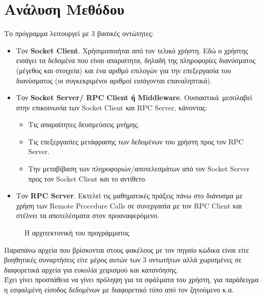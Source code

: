 \section{Ανάλυση Μεθόδου}
Το πρόγραμμα λειτουργεί με 3 βασικές οντώτητες:
\begin{itemize}
    \item Τον \textbf{Socket Client}. Χρήσιμοποιήται από τον τελικό
        χρήστη. Εδώ ο χρήστης εισάγει τα δεδομένα που είναι απαραίτητα, δηλαδή
        της πληροφορίες διανύσματος (μέγεθος και στοιχεία) και ένα αριθμό
        επιλογών για την επεξεργασία του διανύσματος (οι συγκεκριμένοι αριθμοί
        εισάγονται επαναληπτικά).
    \item Τον \textbf{Socket Server/ RPC Client ή Middleware}. Ουσιαστικά\
        μεσολαβεί στην επικοινωνία των Socket Client και RPC Server, κάνοντας:
\begin{itemize}
        \item Τις απαραίτητες δευσμεύσεις μνήμης.
        \item Τις επεξεργασίες μετάφρασης των δεδομένων του χρήστη προς τον
            RPC Server.
        \item Την μεταβίβαση των πληροφοριών/αποτελεσμάτων από τον Socket
            Server προς τον Socket Client και το αντίθετο.
\end{itemize}
    \item Τον \textbf{RPC Server}. Εκτελεί τις μαθηματικές πράξεις πάνω στο
        διάνυσμα με χρήση των Remote Procedure Calls σε συνεργασία με τον
        RPC Client και στέλνει τα αποτελέσματα στον προαναφερόμενο.
\end{itemize}
\begin{figure}[ht]
    \centering
    \caption{\footnotesize{Η αρχιτεκτονική του προγράμματος}}
    \label{fig:searx-oper}
\end{figure}
Παραπάνω αρχεία που βρίσκονται στους φακέλους με τον πηγαίο κώδικα είναι
είτε βοηθητικές συναρτήσεις είτε μέρος αυτών των 3 οντωτήτων αλλά χωρισμένες
σε διαφορετικά αρχεία για ευκολία χειρισμού και κατανόησης.
\\
Έχει γίνει προσπάθεια να γίνει πρόληψη για τα σφάλματα του χρήστη, για
παράδειγμα η εσφαλμένη είσοδος δεδομένων με διαφορετικό τύπο από τον ζητούμενο
κ.α.

